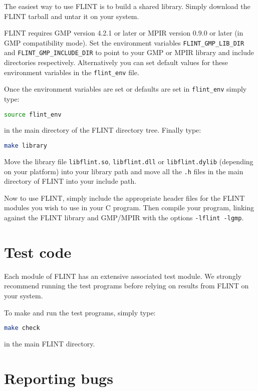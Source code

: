 \documentclass[a4paper,10pt]{book}
\newcommand{\code}{\lstinline}
\begin{document}
The easiest way to use FLINT is to build a shared library.  Simply download 
the FLINT tarball and untar it on your system.

FLINT requires GMP version 4.2.1 or later or MPIR version 0.9.0 or 
later (in GMP compatibility mode).  Set the environment variables 
\code{FLINT_GMP_LIB_DIR} and \code{FLINT_GMP_INCLUDE_DIR} to point 
to your GMP or MPIR library and include directories respectively. 
Alternatively you can set default values for these environment variables 
in the \code{flint_env} file.

Once the environment variables are set or defaults are set in 
\code{flint_env} simply type:

\begin{lstlisting}[language=bash]
source flint_env
\end{lstlisting}

in the main directory of the FLINT directory tree.  Finally type:

\begin{lstlisting}[language=bash]
make library
\end{lstlisting}

Move the library file \code{libflint.so}, \code{libflint.dll} or 
\code{libflint.dylib} (depending on your platform) into your library 
path and move all the \code{.h} files in the main directory of FLINT 
into your include path.

Now to use FLINT, simply include the appropriate header files for 
the FLINT modules you wish to use in your C program.  Then compile 
your program, linking against the FLINT library and GMP/MPIR with 
the options \code{-lflint -lgmp}.

\section{Test code}

Each module of FLINT has an extensive associated test module.  We 
strongly recommend running the test programs before relying on results 
from FLINT on your system. 

To make and run the test programs, simply type:

\begin{lstlisting}[language=bash]
make check
\end{lstlisting}

in the main FLINT directory.

\section{Reporting bugs}
\end{document}
